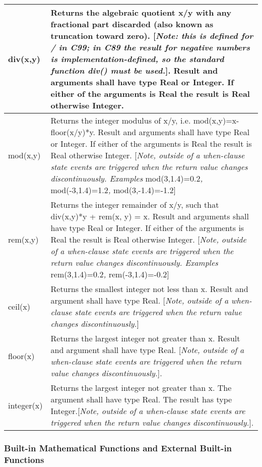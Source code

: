 \begin{longtable}{|p{2cm}|p{12cm}|} \hline
\endhead
div(x,y) & Returns the algebraic quotient x/y with any fractional part
discarded (also known as truncation toward zero). {[}\emph{Note: this is
defined for / in C99; in C89 the result for negative numbers is
implementation-defined, so the standard function div() must be
used.}{]}. Result and arguments shall have type Real or Integer. If
either of the arguments is Real the result is Real otherwise
Integer.\\ \hline
mod(x,y) & Returns the integer modulus of x/y, i.e.
mod(x,y)=x-floor(x/y)*y. Result and arguments shall have type Real or
Integer. If either of the arguments is Real the result is Real otherwise
Integer. {[}\emph{Note, outside of a when-clause state events are
triggered when the return value changes discontinuously. Examples}
mod(3,1.4)=0.2\emph{,} mod(-3,1.4)=1.2\emph{,}
mod(3,-1.4)=-1.2{]}\\ \hline
rem(x,y) & Returns the integer remainder of x/y, such that div(x,y)*y +
rem(x, y) = x. Result and arguments shall have type Real or Integer. If
either of the arguments is Real the result is Real otherwise Integer.
{[}\emph{Note, outside of a when-clause state events are triggered when
the return value changes discontinuously. Examples}
rem(3,1.4)=0.2\emph{,} rem(-3,1.4)=-0.2{]}\\ \hline
ceil(x) & Returns the smallest integer not less than x. Result and
argument shall have type Real. {[}\emph{Note, outside of a when-clause
state events are triggered when the return value changes
discontinuously.}{]}\\ \hline
floor(x) & Returns the largest integer not greater than x. Result and
argument shall have type Real. {[}\emph{Note, outside of a when-clause
state events are triggered when the return value changes
discontinuously.}{]}.\\ \hline
integer(x) & Returns the largest integer not greater
than x. The argument shall have type Real. The result has type
Integer.{[}\emph{Note, outside of a when-clause state
events are triggered when the return value changes
discontinuously.}{]}.\\ \hline
\end{longtable}

\subsubsection{Built-in Mathematical Functions and External Built-in Functions}

